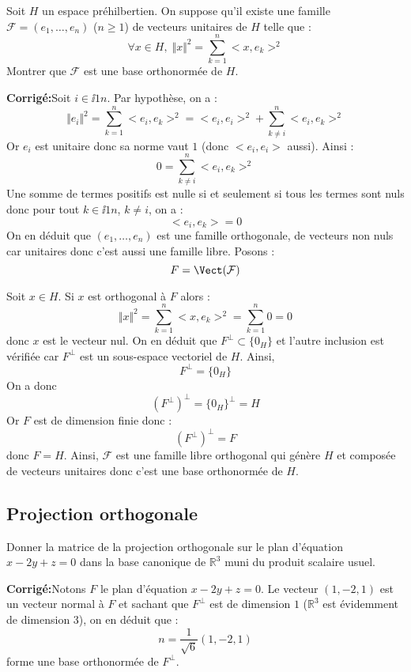 \documentclass[a4paper,twoside,french,11pt]{VcCours}
\newcommand{\corr}{\textbf{Corrigé:}}
\begin{document}
 
\begin{Exercice}{} Soit $H$ un espace préhilbertien. On suppose qu'il existe une famille $\mathcal{F}=(e_1, \ldots, e_n)$ ($n \geq 1$) de vecteurs unitaires de $H$ telle que :
$$ \forall x \in H, \; \Vert x \Vert^2= \sum_{k=1}^n <x,e_k>^2 $$
Montrer que $\mathcal{F}$ est une base orthonormée de $H$.
\end{Exercice}

\corr Soit $i \in \ii{1}{n}$. Par hypothèse, on a :
$$ \Vert e_i \Vert^2= \sum_{k=1}^n <e_i,e_k>^2 = <e_i,e_i>^2 + \sum_{k \neq i}^n <e_i,e_k>^2 $$
Or $e_i$ est unitaire donc sa norme vaut $1$ (donc $<e_i,e_i>$ aussi). Ainsi :
$$ 0 =  \sum_{k \neq i}^n <e_i,e_k>^2 $$
Une somme de termes positifs est nulle si et seulement si tous les termes sont nuls donc pour tout $k \in \ii{1}{n}$, $k \neq i$, on a :
$$<e_i,e_k>=0$$
On en déduit que $(e_1, \ldots, e_n)$ est une famille orthogonale, de vecteurs non nuls car unitaires donc c'est aussi une famille libre. Posons :
$$ F = \Vect(\mathcal{F})$$


\noindent Soit $x \in H$. Si $x$ est orthogonal à $F$ alors :
$$ \Vert x \Vert^2= \sum_{k=1}^n <x,e_k>^2 = \sum_{k=1}^n  0 = 0$$
donc $x$ est le vecteur nul. On en déduit que $F^{\perp} \subset \lbrace 0_H \rbrace$ et l'autre inclusion est vérifiée car $F^{\perp}$ est un sous-espace vectoriel de $H$. Ainsi,
$$ F^{\perp} = \lbrace 0_H \rbrace$$
On a donc 
$$ (F^{\perp})^{\perp} = \lbrace 0_H \rbrace^{\perp} = H$$
Or $F$ est de dimension finie donc :
$$ (F^{\perp})^{\perp} = F$$
donc $F=H$. Ainsi, $\mathcal{F}$ est une famille libre orthogonal qui génère $H$ et composée de vecteurs unitaires donc c'est une base orthonormée de $H$.




\subsection{Projection orthogonale}


\begin{Exercice}{} Donner la matrice de la projection orthogonale sur le plan d'équation $x-2y+z=0$ dans la base canonique de $\mathbb{R}^3$ muni du produit scalaire usuel.
\end{Exercice}

\corr Notons $F$ le plan d'équation $x-2y+z=0$. Le vecteur $(1,-2,1)$ est un vecteur normal à $F$ et sachant que $F^{\perp}$ est de dimension $1$ ($\mathbb{R}^3$ est évidemment de dimension $3$), on en déduit que :
$$ n = \dfrac{1}{\sqrt{6}} (1,-2,1)$$
forme une base orthonormée de $F^{\perp}$. 
\end{document}
